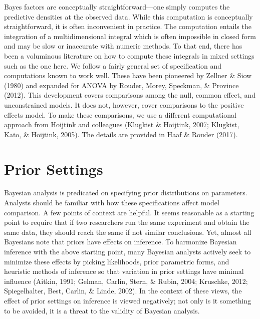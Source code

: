 \documentclass[english,man]{apa6}
\theoremstyle{definition}
\theoremstyle{definition}
\theoremstyle{remark}
\begin{document}
Bayes factors are conceptually straightforward---one simply computes the
predictive densities at the observed data. While this computation is
conceptually straightforward, it is often inconvenient in practice. The
computation entails the integration of a multidimensional integral which
is often impossible in closed form and may be slow or inaccurate with
numeric methods. To that end, there has been a voluminous literature on
how to compute these integrals in mixed settings such as the one here.
We follow a fairly general set of specification and computations known
to work well. These have been pioneered by Zellner \& Siow (1980) and
expanded for ANOVA by Rouder, Morey, Speckman, \& Province (2012). This
development covers comparisons among the null, common effect, and
unconstrained models. It does not, however, cover comparisons to the
positive effects model. To make these comparisons, we use a different
computational approach from Hoijtink and colleagues (Klugkist \&
Hoijtink, 2007; Klugkist, Kato, \& Hoijtink, 2005). The details are
provided in Haaf \& Rouder (2017).

\section{Prior Settings}\label{prior-settings}

Bayesian analysis is predicated on specifying prior distributions on
parameters. Analysts should be familiar with how these specifications
affect model comparison. A few points of context are helpful. It seems
reasonable as a starting point to require that if two researchers run
the same experiment and obtain the same data, they should reach the same
if not similar conclusions. Yet, almost all Bayesians note that priors
have effects on inference. To harmonize Bayesian inference with the
above starting point, many Bayesian analysts actively seek to minimize
these effects by picking likelihoods, prior parametric forms, and
heuristic methods of inference so that variation in prior settings have
minimal influence (Aitkin, 1991; Gelman, Carlin, Stern, \& Rubin, 2004;
Kruschke, 2012; Spiegelhalter, Best, Carlin, \& Linde, 2002). In the
context of these views, the effect of prior settings on inference is
viewed negatively; not only is it something to be avoided, it is a
threat to the validity of Bayesian analysis.
\end{document}
